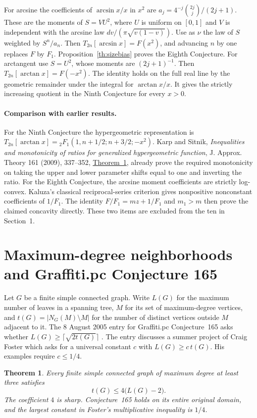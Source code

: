 \documentclass[11pt,a4paper]{article}
\newtheorem{theorem}{Theorem}[section]
\numberwithin{equation}{section}
\begin{document}
For arcsine the coefficients of $\arcsin x/x$ in $x^2$ are
$a_j=4^{-j}\binom{2j}{j}/(2j+1)$. These are the moments of
$S=VU^2$, where $U$ is uniform on $[0,1]$ and $V$ is independent
with the arcsine law $dv/(\pi\sqrt{v(1-v)})$.
Use as $\nu$ the law of $S$ weighted by $S^n/a_n$.
Then $T_{2n}[\arcsin x]=F(x^2)$, and advancing $n$ by one
replaces $F$ by $F_1$. Proposition~\ref{th:sizebias} proves the
Eighth Conjecture. For arctangent use $S=U^2$, whose moments
are $(2j+1)^{-1}$. Then $T_{2n}[\arctan x]=F(-x^2)$.
The identity holds on the full real line by the geometric remainder
under the integral for $\arctan x/x$. It gives the strictly increasing
quotient in the Ninth Conjecture for every $x>0$.

\paragraph{Comparison with earlier results.}
For the Ninth Conjecture the hypergeometric representation is
$T_{2n}[\arctan x]={}_2F_1(1,n+1/2;n+3/2;-x^2)$.
Karp and Sitnik, \emph{Inequalities and monotonicity of ratios for
generalized hypergeometric function}, J. Approx. Theory 161 (2009),
337--352, \href{https://doi.org/10.1016/j.jat.2008.10.002}{Theorem~1},
already prove the required monotonicity on taking the upper and lower
parameter shifts equal to one and inverting the ratio. For the Eighth
Conjecture, the arcsine moment coefficients are strictly log-convex.
Kaluza's classical reciprocal-series criterion gives nonpositive
nonconstant coefficients of $1/F_1$. The identity $F/F_1=mz+1/F_1$
and $m_1>m$ then prove the claimed concavity directly. These two items
are excluded from the ten in Section~1.


\section{Maximum-degree neighborhoods and Graffiti.pc Conjecture 165}
\label{wow165:sec}

Let $G$ be a finite simple connected graph. Write $L(G)$ for the maximum
number of leaves in a spanning tree, $M$ for its set of maximum-degree
vertices, and $t(G)=|N_G(M)\setminus M|$ for the number of distinct
vertices outside $M$ adjacent to it. The 8 August 2005 entry for
Graffiti.pc Conjecture~165 asks whether $L(G)\ge\lceil\sqrt{2t(G)}\rceil$
\cite{wow165:registry}. The entry discusses a summer project of Craig
Foster which asks for a universal constant $c$ with $L(G)\ge c\,t(G)$.
His examples require $c\le1/4$.
\begin{theorem}\label{wow165:theorem}
Every finite simple connected graph of maximum degree at least three satisfies
\[
 t(G)\le4\bigl(L(G)-2\bigr).
\]
The coefficient $4$ is sharp. Conjecture~165 holds on its entire
original domain, and the largest constant in Foster's multiplicative
inequality is $1/4$.
\end{theorem}
\end{document}
